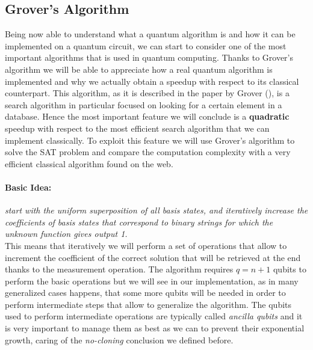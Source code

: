 \documentclass[english]{article}
\begin{document}
		\subsection{Grover's Algorithm}
		\label{sec:grover}
			Being now able to understand what a quantum algorithm is and how it can be implemented on a quantum circuit, we can start to consider one of the most important algorithms that is used in quantum computing. Thanks to Grover's algorithm we will be able to appreciate how a real quantum algorithm is implemented and why we actually obtain a speedup with respect to its classical counterpart. This algorithm, as it is described in the paper by Grover (\cite{grover}), is a search algorithm in particular focused on looking for a certain element in a database. Hence the most important feature we will conclude is a \textbf{quadratic} speedup with respect to the most efficient search algorithm that we can implement classically. To exploit this feature we will use Grover's algorithm to solve the SAT problem and compare the computation complexity with a very efficient classical algorithm found on the web. 
			
			\paragraph{Basic Idea:} \emph{start with the uniform superposition of all basis states, and iteratively increase the coefficients of basis states that correspond to binary strings for which the unknown function gives output 1.} \\
			
			This means that iteratively we will perform a set of operations that allow to increment the coefficient of the correct solution that will be retrieved at the end thanks to the measurement operation. The algorithm requires $q = n + 1$ qubits to perform the basic operations but we will see in our implementation, as in many generalized cases happens, that some more qubits will be needed in order to perform intermediate steps that allow to generalize the algorithm. The qubits used to perform intermediate operations are typically called \emph{ancilla qubits} and it is very important to manage them as best as we can to prevent their exponential growth, caring of the \emph{no-cloning} conclusion we defined before.
			
\end{document}
